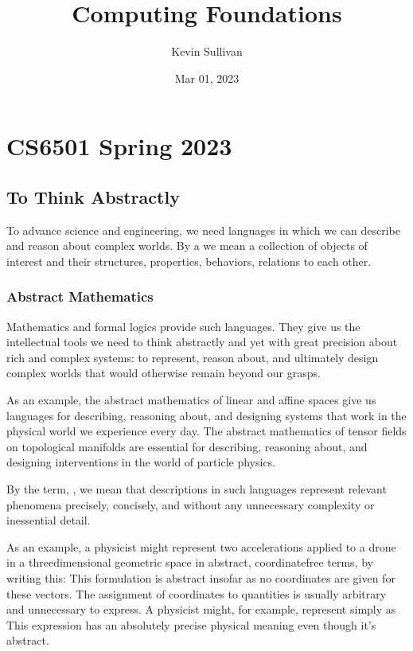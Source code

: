 \documentclass[letterpaper,10pt,english]{sphinxmanual}
\title{Computing Foundations}
\date{Mar 01, 2023}
\author{Kevin Sullivan}
\begin{document}
\pagestyle{empty}
\sphinxmaketitle
\pagestyle{plain}
\sphinxtableofcontents
\pagestyle{normal}
\label{\detokenize{index::doc}}


\sphinxstepscope


\chapter{CS6501 Spring 2023}
\label{\detokenize{A_00_Introduction:cs6501-spring-2023}}\label{\detokenize{A_00_Introduction:introduction}}\label{\detokenize{A_00_Introduction::doc}}

\section{To Think Abstractly}
\label{\detokenize{A_00_Introduction:to-think-abstractly}}
\sphinxAtStartPar
To advance science and engineering, we need languages in
which we can describe and reason about complex worlds. By
a  we mean a collection of objects of interest and
their structures, properties, behaviors, relations to each
other.


\subsection{Abstract Mathematics}
\label{\detokenize{A_00_Introduction:abstract-mathematics}}
\sphinxAtStartPar
Mathematics and formal logics provide such languages. They
give us the intellectual tools we need to think abstractly
and yet with great precision about rich and complex systems:
to represent, reason about, and ultimately design complex
worlds that would otherwise remain beyond our grasps.

\sphinxAtStartPar
As an example, the abstract mathematics of linear and affine
spaces give us languages for describing, reasoning about, and
designing systems that work in the  physical world
we experience every day. The abstract mathematics of tensor
fields on topological manifolds are essential for describing,
reasoning about, and designing interventions in the 
world of particle physics.

\sphinxAtStartPar
By the term, , we mean that descriptions in such
languages represent relevant phenomena precisely, concisely,
and without any unnecessary complexity or inessential detail.

\sphinxAtStartPar
As an example, a physicist might represent two accelerations
applied to a drone in a three\sphinxhyphen{}dimensional geometric space in
abstract, coordinate\sphinxhyphen{}free terms, by writing this:  This formulation is abstract
insofar as no coordinates are given for these vectors. The
assignment of coordinates to  quantities is usually
arbitrary and unnecessary to express. A physicist might, for
example, represent  simply as
 This expression has an absolutely precise physical
meaning even though it’s abstract.
\end{document}
